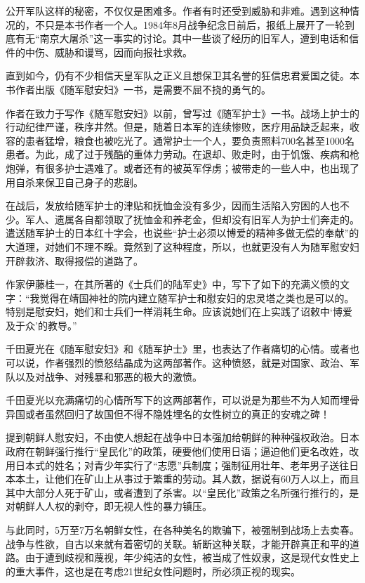 \documentclass[12pt,UTF8]{ctexbook}
\begin{document}
公开军队这样的秘密，不仅仅是困难多。作者有时还受到威胁和非难。遇到这种情况的，不只是本书作者一个人。1984年8月战争纪念日前后，报纸上展开了一轮到底有无“南京大屠杀”这一事实的讨论。其中一些谈了经历的旧军人，遭到电话和信件的中伤、威胁和谩骂，因而向报社求救。

直到如今，仍有不少相信天皇军队之正义且想保卫其名誉的狂信忠君爱国之徒。本书作者出版《随军慰安妇》一书，是需要不屈不挠的勇气的。

作者在致力于写作《随军慰安妇》以前，曾写过《随军护士》一书。战场上护士的行动纪律严谨，秩序井然。但是，随着日本军的连续惨败，医疗用品缺乏起来，收容的患者猛增，粮食也被吃光了。通常护士一个人，要负责照料700名甚至1000名患者。为此，成了过于残酷的重体力劳动。在退却、败走时，由于饥饿、疾病和枪炮弹，有很多护士遇难了。或者还有的被英军俘虏；被带走的一些人中，也出现了用自杀来保卫自己身子的悲剧。

在战后，发放给随军护士的津贴和抚恤金没有多少，因而生活陷入穷困的人也不少。军人、遗属各自都领取了抚恤金和养老金，但却没有旧军人为护士们奔走的。遣送随军护士的日本红十字会，也说些“护士必须以博爱的精神多做无偿的奉献”的大道理，对她们不理不睬。竟然到了这种程度，所以，也就更没有人为随军慰安妇开辟救济、取得报偿的道路了。

作家伊藤桂一，在其所著的《士兵们的陆军史》中，写下了如下的充满义愤的文字：“我觉得在靖国神社的院内建立随军护士和慰安妇的忠灵塔之类也是可以的。特别是慰安妇，她们和士兵们一样消耗生命。应该说她们在上实践了诏敕中‘博爱及于众’的教导。”

千田夏光在《随军慰安妇》和《随军护士》里，也表达了作者痛切的心情。或者也可以说，作者强烈的愤怒结晶成为这两部著作。这种愤怒，就是对国家、政治、军队以及对战争、对残暴和邪恶的极大的激愤。

千田夏光以充满痛切的心情所写下的这两部著作，可以说是为那些不为人知而埋骨异国或者虽然回归了故国但不得不隐姓埋名的女性树立的真正的安魂之碑！

提到朝鲜人慰安妇，不由使人想起在战争中日本强加给朝鲜的种种强权政治。日本政府在朝鲜强行推行“皇民化”的政策，硬要他们使用日语；逼迫他们更名改姓，改用日本式的姓名；对青少年实行了“志愿”兵制度；强制征用壮年、老年男子送往日本本土，让他们在矿山上从事过于繁重的劳动。其人数，据说有60万人以上，而且其中大部分人死于矿山，或者遭到了杀害。以“皇民化”政策之名所强行推行的，是对朝鲜人人权的剥夺，即无视人性的暴力镇压。

与此同时，5万至7万名朝鲜女性，在各种美名的欺骗下，被强制到战场上去卖春。战争与性欲，自古以来就有着密切的关联。斩断这种关联，才能开辟真正和平的道路。由于遭到歧视和蔑视，年少纯洁的女性，被当成了性奴隶，这是现代女性史上的重大事件，这也是在考虑21世纪女性问题时，所必须正视的现实。
\end{document}
